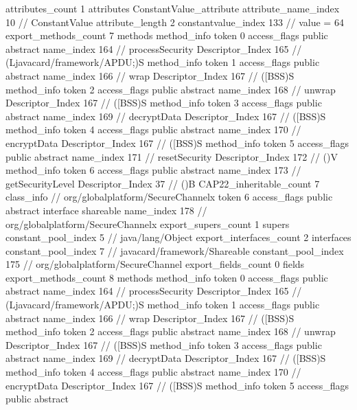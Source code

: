 {{{{{				attributes_count	1
				attributes {
				ConstantValue_attribute {
					attribute_name_index	10		// ConstantValue
					attribute_length	2
					constantvalue_index	133		// value = 64
				}
				}
			}
			}
			export_methods_count	7
			methods {
				method_info {
					token	0
					access_flags	public abstract
					name_index	164		// processSecurity
					Descriptor_Index	165		// (Ljavacard/framework/APDU;)S
				}
				method_info {
					token	1
					access_flags	public abstract
					name_index	166		// wrap
					Descriptor_Index	167		// ([BSS)S
				}
				method_info {
					token	2
					access_flags	public abstract
					name_index	168		// unwrap
					Descriptor_Index	167		// ([BSS)S
				}
				method_info {
					token	3
					access_flags	public abstract
					name_index	169		// decryptData
					Descriptor_Index	167		// ([BSS)S
				}
				method_info {
					token	4
					access_flags	public abstract
					name_index	170		// encryptData
					Descriptor_Index	167		// ([BSS)S
				}
				method_info {
					token	5
					access_flags	public abstract
					name_index	171		// resetSecurity
					Descriptor_Index	172		// ()V
				}
				method_info {
					token	6
					access_flags	public abstract
					name_index	173		// getSecurityLevel
					Descriptor_Index	37		// ()B
				}
			}
			CAP22_inheritable_count	7
		}
		class_info {		// org/globalplatform/SecureChannelx
			token	6
			access_flags	public abstract interface shareable
			name_index	178		// org/globalplatform/SecureChannelx
			export_supers_count	1
			supers {
				constant_pool_index	5		// java/lang/Object
			}
			export_interfaces_count	2
			interfaces {
				constant_pool_index	7		// javacard/framework/Shareable
				constant_pool_index	175		// org/globalplatform/SecureChannel
			}
			export_fields_count	0
			fields {
			}
			export_methods_count	8
			methods {
				method_info {
					token	0
					access_flags	public abstract
					name_index	164		// processSecurity
					Descriptor_Index	165		// (Ljavacard/framework/APDU;)S
				}
				method_info {
					token	1
					access_flags	public abstract
					name_index	166		// wrap
					Descriptor_Index	167		// ([BSS)S
				}
				method_info {
					token	2
					access_flags	public abstract
					name_index	168		// unwrap
					Descriptor_Index	167		// ([BSS)S
				}
				method_info {
					token	3
					access_flags	public abstract
					name_index	169		// decryptData
					Descriptor_Index	167		// ([BSS)S
				}
				method_info {
					token	4
					access_flags	public abstract
					name_index	170		// encryptData
					Descriptor_Index	167		// ([BSS)S
				}
				method_info {
					token	5
					access_flags	public abstract
}}}}}
